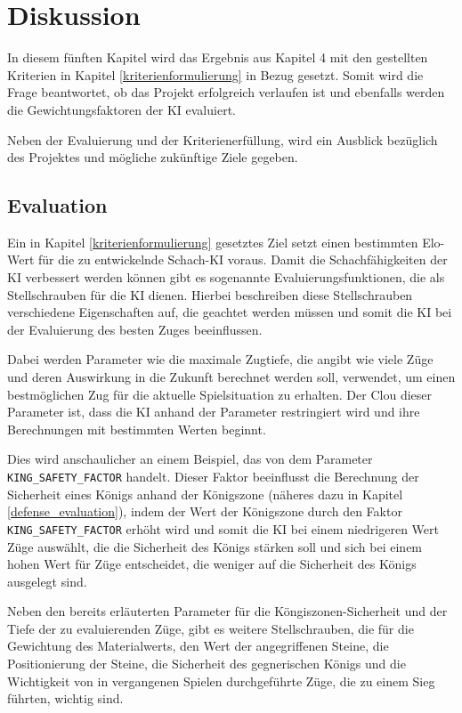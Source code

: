 \chapter{Diskussion}

In diesem fünften Kapitel wird das Ergebnis aus Kapitel 4 mit den gestellten Kriterien in Kapitel \ref{kriterienformulierung} in Bezug gesetzt. Somit wird die Frage beantwortet, ob das Projekt erfolgreich verlaufen ist und ebenfalls werden die Gewichtungsfaktoren der KI evaluiert. 

Neben der Evaluierung und der Kriterienerfüllung, wird ein Ausblick bezüglich des Projektes und mögliche zukünftige Ziele gegeben.

\section{Evaluation}\label{evaluation}
Ein in Kapitel \ref{kriterienformulierung} gesetztes Ziel setzt einen bestimmten Elo-Wert für die zu entwickelnde Schach-KI voraus. Damit die Schachfähigkeiten der KI verbessert werden können gibt es sogenannte Evaluierungsfunktionen, die als Stellschrauben für die KI dienen. Hierbei beschreiben diese Stellschrauben verschiedene Eigenschaften auf, die geachtet werden müssen und somit die KI bei der Evaluierung des besten Zuges beeinflussen. 

Dabei werden Parameter wie die maximale Zugtiefe, die angibt wie viele Züge und deren Auswirkung in die Zukunft berechnet werden soll, verwendet, um einen bestmöglichen Zug für die aktuelle Spielsituation zu erhalten. Der Clou dieser Parameter ist, dass die KI anhand der Parameter restringiert wird und ihre Berechnungen mit bestimmten Werten beginnt.

Dies wird anschaulicher an einem Beispiel, das von dem Parameter \texttt{KING\_SAFETY\_FACTOR} handelt. Dieser Faktor beeinflusst die Berechnung der Sicherheit eines Königs anhand der Königszone (näheres dazu in Kapitel \ref{defense_evaluation}), indem der Wert der Königszone durch den Faktor \texttt{KING\_SAFETY\_FACTOR} erhöht wird und somit die KI bei einem niedrigeren Wert Züge auswählt, die die Sicherheit des Königs stärken soll und sich bei einem hohen Wert für Züge entscheidet, die weniger auf die Sicherheit des Königs ausgelegt sind.

Neben den bereits erläuterten Parameter für die Köngiszonen-Sicherheit und der Tiefe der zu evaluierenden Züge, gibt es weitere Stellschrauben, die für die Gewichtung des Materialwerts, den Wert der angegriffenen Steine, die Positionierung der Steine, die Sicherheit des gegnerischen Königs und die Wichtigkeit von in vergangenen Spielen durchgeführte Züge, die zu einem Sieg führten, wichtig sind.

